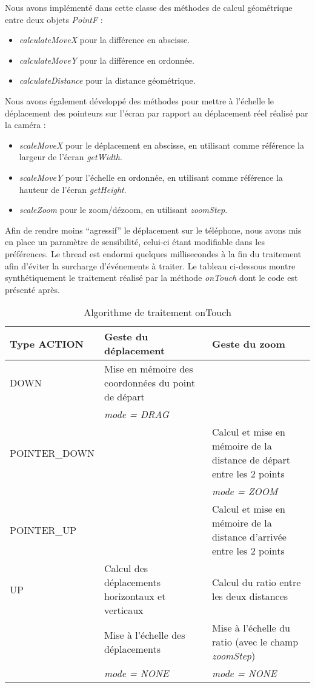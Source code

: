 Nous avons implémenté dans cette classe des méthodes de calcul géométrique entre deux objets \textit{PointF} :
\begin{itemize}
	\item \textit{calculateMoveX} pour la différence en abscisse.
	\item \textit{calculateMoveY} pour la différence en ordonnée.
	\item \textit{calculateDistance} pour la distance géométrique.
\end{itemize}

Nous avons également développé des méthodes pour mettre à l'échelle le déplacement des pointeurs sur l'écran par rapport au déplacement réel réalisé par la caméra :
\begin{itemize}
	\item \textit{scaleMoveX} pour le déplacement en abscisse, en utilisant comme
	référence la largeur de l'écran \textit{getWidth}.
	\item \textit{scaleMoveY} pour l'échelle en ordonnée, en utilisant comme
	référence la hauteur de l'écran \textit{getHeight}.
	\item \textit{scaleZoom} pour le zoom/dézoom, en utilisant \textit{zoomStep}.
\end{itemize}

Afin de rendre moins ``agressif'' le déplacement sur le téléphone, nous avons
mis en place un paramètre de sensibilité, celui-ci étant modifiable dans les préférences.
Le thread est endormi quelques
millisecondes à la fin du traitement afin d'éviter la surcharge
d'événements à traiter. Le tableau ci-dessous montre synthétiquement le
traitement réalisé par la méthode \textit{onTouch} dont le code est présenté après.\newline
\begin{table}[H]
\centering
\begin{tabular}{|p{0.2\linewidth}|p{0.4\linewidth}| p{0.4\linewidth}|}
\hline
Type ACTION & Geste du déplacement & Geste du zoom \\
\hline
DOWN & Mise en mémoire des coordonnées du point de départ &  \\
 & \textit{mode = DRAG} & \\
POINTER\_DOWN & & Calcul et mise en mémoire de la distance de départ entre les 2
points \\ & & \textit{mode = ZOOM} \\
POINTER\_UP & & Calcul et mise en mémoire de la distance d'arrivée entre les 2
points \\ UP & Calcul des déplacements horizontaux et verticaux & Calcul du
ratio entre les deux distances \\ & Mise à l'échelle des déplacements & Mise à l'échelle du ratio (avec le champ \textit{zoomStep}) \\
 & \textit{mode = NONE} & \textit{mode = NONE} \\
\hline
\end{tabular}
\caption{Algorithme de traitement onTouch}
\end{table}

